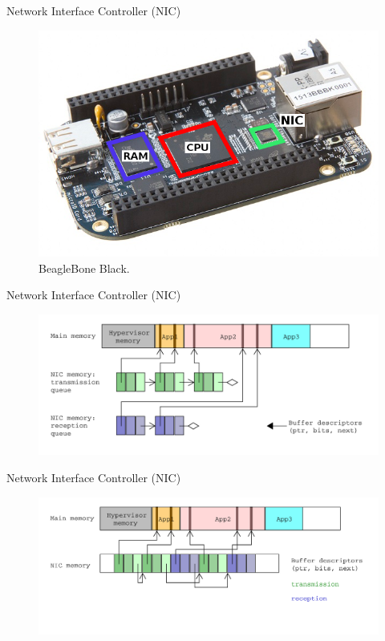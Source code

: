 \documentclass{beamer}
\begin{document}
\begin{frame}{Network Interface Controller (NIC)}
    \begin{figure}
        \includegraphics[]{figures/BBB_cpu_ram_nic.png}
        \caption{BeagleBone Black.}
        \label{bbb_nic}
    \end{figure}
\end{frame}

\begin{frame}{Network Interface Controller (NIC)}
    \begin{figure}
        \includegraphics[width=\textwidth]{figures/nic-bd.pdf}
        \label{nic_bd}
    \end{figure}
\end{frame}

\begin{frame}{Network Interface Controller (NIC)}
    \begin{figure}
        \includegraphics[width=\textwidth]{figures/nic-bd-in_mem.pdf}
        \label{nic_bd_inmem}
    \end{figure}
\end{frame}
\end{document}
